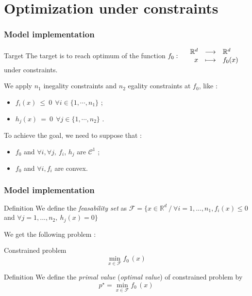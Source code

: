 \documentclass[unknownkeysallowed]{beamer}
\begin{document}
\section{Optimization under constraints}
\label{sec:conclusion}
\begin{frame}
\frametitle{Model implementation}
\begin{block}{Target}
The target is to reach optimum of the function $f_0 : \begin{array}{l rcl}
 & \mathbb{R}^d & \longrightarrow & \mathbb{R}^d \\
    & x & \longmapsto & f_0(x)
\end{array}$ under constraints.
\end{block}
\vspace{0.5cm}
We apply $n_1$ inegality constraints and $n_2$ egality constraints at $f_0$, like :
\begin{itemize}
    \item $f_i(x)\  \leq \  0 \  \ \forall i \in \{1, \cdots , n_1\}$ ;
    \item $h_j(x)\  = \  0 \  \ \forall j \in \{1, \cdots , n_2\}$ .
\end{itemize}
\vspace{0.25cm}
To achieve the goal, we need to suppose that :
\begin{itemize}
    \item $f_0$ and $\forall i, \forall j, \ f_i$, $h_j$ are $\mathcal{C}^1$ ;
    \item $f_0$ and $\forall i ,  f_i$ are convex.
\end{itemize}
\end{frame}

\begin{frame}
\frametitle{Model implementation}
\begin{block}{Definition}
We define the \textit{feasability set} as $\mathcal{F} = \{x \in \mathbb{R}^d \ / \  \forall i=1,...,n_1, f_i(x)\leq 0 $ and $\forall j=1,...,n_2, \ h_j(x)=0\}$
\end{block}
\vspace{0.3cm}
We get the following problem :
\begin{alertblock}{Constrained problem}
$$\min_{x \in \mathcal{F}} f_0\,(x)$$
\end{alertblock}
\vspace{0.3cm}
\begin{block}{Definition}
We define the \textit{primal value} (\textit{optimal value}) of constrained problem by $$p^{\star} = \min_{x \in \mathcal{F}} f_0\,(x)$$
\end{block}
\end{frame}
\end{document}
